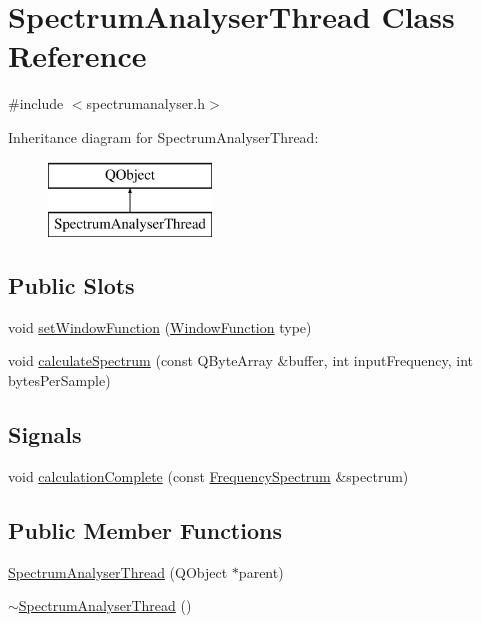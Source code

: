 \hypertarget{class_spectrum_analyser_thread}{}\section{Spectrum\+Analyser\+Thread Class Reference}
\label{class_spectrum_analyser_thread}


{\ttfamily \#include $<$spectrumanalyser.\+h$>$}

Inheritance diagram for Spectrum\+Analyser\+Thread\+:\begin{figure}[H]
\begin{center}
\leavevmode
\includegraphics[height=2.000000cm]{class_spectrum_analyser_thread}
\end{center}
\end{figure}
\subsection*{Public Slots}
\begin{DoxyCompactItemize}
\item 
void \hyperlink{class_spectrum_analyser_thread_a823681736ef2719fbb6aec132a75b6cb}{set\+Window\+Function} (\hyperlink{spectrum_8h_adae4545e1609513867a86cc5e91fc1d4}{Window\+Function} type)
\item 
void \hyperlink{class_spectrum_analyser_thread_a6dc32705bf41e75f8d16f9c27bd2ee65}{calculate\+Spectrum} (const Q\+Byte\+Array \&buffer, int input\+Frequency, int bytes\+Per\+Sample)
\end{DoxyCompactItemize}
\subsection*{Signals}
\begin{DoxyCompactItemize}
\item 
void \hyperlink{class_spectrum_analyser_thread_adb2c9b6a5e017cd0805dac29c754b7f0}{calculation\+Complete} (const \hyperlink{class_frequency_spectrum}{Frequency\+Spectrum} \&spectrum)
\end{DoxyCompactItemize}
\subsection*{Public Member Functions}
\begin{DoxyCompactItemize}
\item 
\hyperlink{class_spectrum_analyser_thread_a35109a92c671b97f2cdaef0dcc5ab6c2}{Spectrum\+Analyser\+Thread} (Q\+Object $\ast$parent)
\item 
\hyperlink{class_spectrum_analyser_thread_a5d8f22dd659e87447f29bb7271a5f289}{$\sim$\+Spectrum\+Analyser\+Thread} ()
\end{DoxyCompactItemize}


